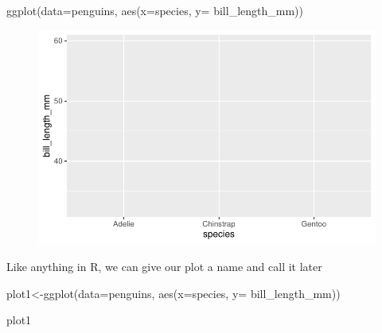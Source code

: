 \documentclass[
  letterpaper,
  DIV=11,
  numbers=noendperiod]{scrartcl}
\newenvironment{Shaded}{\begin{snugshade}}{\end{snugshade}}
\newcommand{\AttributeTok}[1]{\textcolor[rgb]{0.40,0.45,0.13}{#1}}
\newcommand{\FunctionTok}[1]{\textcolor[rgb]{0.28,0.35,0.67}{#1}}
\newcommand{\NormalTok}[1]{\textcolor[rgb]{0.00,0.23,0.31}{#1}}
\newcommand{\OtherTok}[1]{\textcolor[rgb]{0.00,0.23,0.31}{#1}}
\begin{document}
\begin{Shaded}
\begin{Highlighting}[]
\FunctionTok{ggplot}\NormalTok{(}\AttributeTok{data=}\NormalTok{penguins, }\FunctionTok{aes}\NormalTok{(}\AttributeTok{x=}\NormalTok{species, }\AttributeTok{y=}\NormalTok{ bill\_length\_mm)) }
\end{Highlighting}
\end{Shaded}

\begin{figure}[H]

{\centering \includegraphics{basic_graphs_files/figure-pdf/unnamed-chunk-3-1.pdf}

}

\end{figure}

Like anything in R, we can give our plot a name and call it later

\begin{Shaded}
\begin{Highlighting}[]
\NormalTok{plot1}\OtherTok{\textless{}{-}}\FunctionTok{ggplot}\NormalTok{(}\AttributeTok{data=}\NormalTok{penguins, }\FunctionTok{aes}\NormalTok{(}\AttributeTok{x=}\NormalTok{species, }\AttributeTok{y=}\NormalTok{ bill\_length\_mm)) }

\NormalTok{plot1}
\end{Highlighting}
\end{Shaded}
\end{document}
